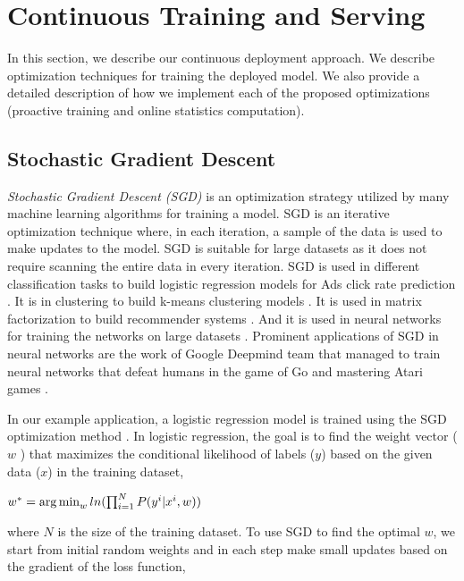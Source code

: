 \section{Continuous Training and Serving} \label{continuous-training-serving}
In this section, we describe our continuous deployment approach.
We describe optimization techniques for training the deployed model.
We also provide a detailed description of how we implement each of the proposed optimizations (proactive training and online statistics computation).

\subsection{Stochastic Gradient Descent} \label{sgd}
\textit{Stochastic Gradient Descent (SGD)} is an optimization strategy utilized by many machine learning algorithms for training a model.
SGD is an iterative optimization technique where, in each iteration, a sample of the data is used to make updates to the model.
SGD is suitable for large datasets \cite{bottou2010large} as it does not require scanning the entire data in every iteration.
SGD is used in different classification tasks to build logistic regression models for Ads click rate prediction \cite{zhang2004solving, macmahan2013}.
It is in clustering to build k-means clustering models \cite{bottou1995convergence}.
It is used in matrix factorization to build recommender systems \cite{koren2009matrix,  funk2006netflix}.
And it is used in neural networks for training the networks on large datasets \cite{dean2012large}.
Prominent applications of SGD in neural networks are the work of Google Deepmind team that managed to train neural networks that defeat humans in the game of Go \cite{silver2016mastering} and mastering Atari games \cite{mnih2013playing} .

In our example application, a logistic regression model is trained using the SGD optimization method \cite{macmahan2013}.
In logistic regression, the goal is to find the weight vector ($w$ ) that maximizes the conditional likelihood of labels ($y$) based on the given data ($x$) in the training dataset,

\begin{center}
$w^* = \operatorname*{arg\,min}_w ln(\prod_{i=1}^{N} P(y^i | x^i, w))$
\end{center}

where $N$ is the size of the training dataset.
To use SGD to find the optimal $w$, we start from initial random weights and in each step make small updates based on the gradient of the loss function, 

